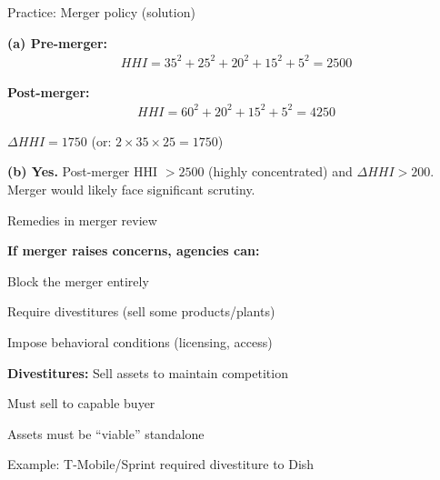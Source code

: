 \documentclass[notes,11pt, aspectratio=169]{beamer}
\newenvironment{wideitemize}{\itemize\addtolength{\itemsep}{10pt}}{\enditemize}
\newenvironment{wideenumerate}{\enumerate\addtolength{\itemsep}{10pt}}{\endenumerate}
\begin{document}
\begin{frame}{Practice: Merger policy (solution)}
	\begin{wideitemize}
		\item \textbf{(a) Pre-merger:}
		\begin{align*}
			HHI = 35^2 + 25^2 + 20^2 + 15^2 + 5^2 = 2500
		\end{align*}
		\item \textbf{Post-merger:}
		\begin{align*}
			HHI = 60^2 + 20^2 + 15^2 + 5^2 = 4250
		\end{align*}
		\item $\Delta HHI = 1750$ (or: $2 \times 35 \times 25 = 1750$)
		\item \textbf{(b) Yes.} Post-merger HHI $> 2500$ (highly concentrated) and $\Delta HHI > 200$. Merger would likely face significant scrutiny.
	\end{wideitemize}
\end{frame}

\begin{frame}{Remedies in merger review}
	\begin{wideitemize}
		\item \textbf{If merger raises concerns, agencies can:}
		\begin{wideenumerate}
			\vspace{5pt}
			\item Block the merger entirely
			\item Require divestitures (sell some products/plants)
			\item Impose behavioral conditions (licensing, access)
		\end{wideenumerate}
		\item \textbf{Divestitures:} Sell assets to maintain competition
		\begin{wideitemize}
			\vspace{5pt}
			\item Must sell to capable buyer
			\item Assets must be ``viable'' standalone
		\end{wideitemize}
		\item Example: T-Mobile/Sprint required divestiture to Dish
	\end{wideitemize}
\end{frame}
\end{document}
